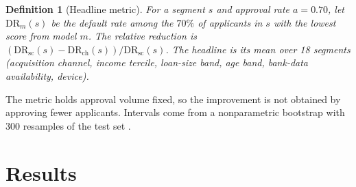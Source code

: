 \documentclass[10pt,a4paper]{article}
\newtheorem{definition}{Definition}
\begin{document}
\begin{definition}[Headline metric]
For a segment $s$ and approval rate $a=0.70$, let $\mathrm{DR}_m(s)$ be the default rate among the $70\%$ of applicants in $s$ with the lowest score from model $m$. The relative reduction is $(\mathrm{DR}_{\mathrm{sc}}(s)-\mathrm{DR}_{\mathrm{ch}}(s))/\mathrm{DR}_{\mathrm{sc}}(s)$. The headline is its mean over 18 segments (acquisition channel, income tercile, loan-size band, age band, bank-data availability, device).
\end{definition}
The metric holds approval volume fixed, so the improvement is not obtained by approving fewer applicants. Intervals come from a nonparametric bootstrap with 300 resamples of the test set \cite{efron}.

\section{Results}
\end{document}
